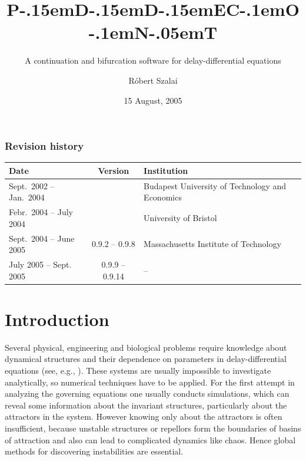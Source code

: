 \documentclass[10pt,a4paper]{ddedoc}
\def\pdde{{P\kern-.15emD\kern-.15emD\kern-.15emE\raisebox{.25ex}{-}C\kern-.1emO\kern-.1emN\kern-.05emT}}
\begin{document}
\lstset{language=C++,tabsize=3,columns=flexible,breaklines=true,escapechar=\%}
\makeatother
%
\title{\pdde}
\subtitle{A continuation and bifurcation software for delay-differential equations}
\author{R\'obert Szalai}
\newcommand{\pddever}{0.9.15}
\version{\pddever}
\date{15 August, 2005}
\maketitle

\subsubsection*{Revision history}

\begin{table}[h!]
\begin{center}
  \begin{tabular}{ |l|c|l| }
    \hline Date & Version & Institution \\
    \hline Sept.\ 2002 -- Jan.\ 2004 & & Budapest University of Technology and Economics \\
    \hline Febr.\ 2004 -- July 2004 & & University of Bristol \\
    \hline Sept.\ 2004 -- June 2005 & 0.9.2 -- 0.9.8 & Massachusetts Institute of Technology \\
    \hline July 2005 -- Sept. 2005 & 0.9.9 -- 0.9.14 & -- \\
    \hline
  \end{tabular}
\end{center}
\end{table}

\tableofcontents

\newpage

\section{Introduction}

Several physical, engineering and biological problems require knowledge about dynamical structures and their dependence on parameters in delay-differential equations (see, e.g., \cite{orosz,kirk}). These systems are usually impossible to investigate analytically, so numerical techniques have to be applied. For the first attempt in analyzing the governing equations one usually conducts simulations, which can reveal some information about the invariant structures, particularly about the attractors in the system. However knowing only about the attractors is often insufficient, because unstable structures or repellors form the boundaries of basins of attraction and also can lead to complicated dynamics like chaos. Hence global methods for discovering instabilities are essential.
\end{document}
